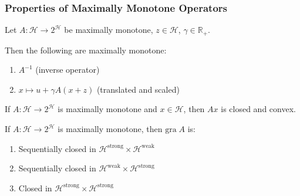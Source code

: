 \documentclass[aspectratio=169,10pt]{beamer}
\newcommand{\gra}{\mathrm{gra}\;}
\newcommand{\Hilbert}{\mathcal{H}}
\newcommand{\Reals}{\mathbb{R}}
\begin{document}
\begin{frame}
    \frametitle{Properties of Maximally Monotone Operators}

    \begin{theorem}[Proposition 20.22]
        Let $A : \Hilbert \to 2^{\Hilbert}$ be maximally monotone, $z \in \Hilbert$, $\gamma \in \Reals_+$.

        Then the following are maximally monotone:
        \begin{enumerate}
            \item $A^{-1}$ (inverse operator)
            \item $x \mapsto u + \gamma A(x + z)$ (translated and scaled)
        \end{enumerate}
    \end{theorem}

    \vspace{0.8em}

    \begin{theorem}
        If $A : \Hilbert \to 2^{\Hilbert}$ is maximally monotone and $x \in \Hilbert$,
        then $Ax$ is closed and convex.
    \end{theorem}

    \vspace{0.8em}

    \begin{theorem}
        If $A : \Hilbert \to 2^{\Hilbert}$ is maximally monotone, then $\gra A$ is:
        \begin{enumerate}
            \item[\textbf{(i)}] Sequentially closed in $\Hilbert^{\text{strong}} \times \Hilbert^{\text{weak}}$
            \item[\textbf{(ii)}] Sequentially closed in $\Hilbert^{\text{weak}} \times \Hilbert^{\text{strong}}$
            \item[\textbf{(iii)}] Closed in $\Hilbert^{\text{strong}} \times \Hilbert^{\text{strong}}$
        \end{enumerate}
    \end{theorem}
\end{frame}
\end{document}
